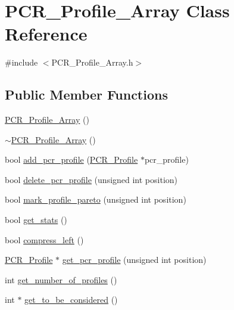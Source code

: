 \hypertarget{class_p_c_r___profile___array}{}\section{P\+C\+R\+\_\+\+Profile\+\_\+\+Array Class Reference}
\label{class_p_c_r___profile___array}


{\ttfamily \#include $<$P\+C\+R\+\_\+\+Profile\+\_\+\+Array.\+h$>$}

\subsection*{Public Member Functions}
\begin{DoxyCompactItemize}
\item 
\mbox{\hyperlink{class_p_c_r___profile___array_a97f37de2d876094a0c8ab9edb80bfb50}{P\+C\+R\+\_\+\+Profile\+\_\+\+Array}} ()
\item 
\mbox{\hyperlink{class_p_c_r___profile___array_a12e0a3168f5769787764f2e27c13a248}{$\sim$\+P\+C\+R\+\_\+\+Profile\+\_\+\+Array}} ()
\item 
bool \mbox{\hyperlink{class_p_c_r___profile___array_a5b7ae88e5672bdc86957d8ae0ceef1b0}{add\+\_\+pcr\+\_\+profile}} (\mbox{\hyperlink{class_p_c_r___profile}{P\+C\+R\+\_\+\+Profile}} $\ast$pcr\+\_\+profile)
\item 
bool \mbox{\hyperlink{class_p_c_r___profile___array_a4b1ef7c1dad3c7bd8705e742b3c7eae5}{delete\+\_\+pcr\+\_\+profile}} (unsigned int position)
\item 
bool \mbox{\hyperlink{class_p_c_r___profile___array_a57b22954d1a22097d45dc9083d147605}{mark\+\_\+profile\+\_\+pareto}} (unsigned int position)
\item 
bool \mbox{\hyperlink{class_p_c_r___profile___array_ae8ce6ceab4a0e8cf9ad622cc418e1c7f}{get\+\_\+stats}} ()
\item 
bool \mbox{\hyperlink{class_p_c_r___profile___array_af33c2dcfeb01b3cf9516e7a9c5515004}{compress\+\_\+left}} ()
\item 
\mbox{\hyperlink{class_p_c_r___profile}{P\+C\+R\+\_\+\+Profile}} $\ast$ \mbox{\hyperlink{class_p_c_r___profile___array_ac17c28f26c27e61b6a6fd4189a4a2201}{get\+\_\+pcr\+\_\+profile}} (unsigned int position)
\item 
int \mbox{\hyperlink{class_p_c_r___profile___array_ac135890d8866e94c20794012f38b58ab}{get\+\_\+number\+\_\+of\+\_\+profiles}} ()
\item 
int $\ast$ \mbox{\hyperlink{class_p_c_r___profile___array_ac05cfcb1d903bd46fb83ab32533f8fce}{get\+\_\+to\+\_\+be\+\_\+considered}} ()
\end{DoxyCompactItemize}


